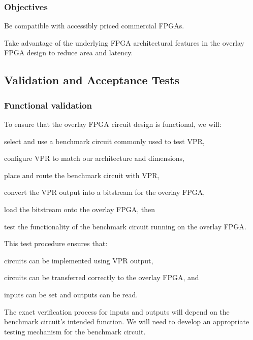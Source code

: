 \subsubsection{Objectives}

\begin{itemlist}
	\item Be compatible with accessibly priced commercial FPGAs.
	\item Take advantage of the underlying FPGA architectural features in the overlay FPGA design to reduce area and latency.
\end{itemlist}


\subsection{Validation and Acceptance Tests}


\subsubsection{Functional validation}

To ensure that the overlay FPGA circuit design is functional, we will:
\begin{enumeration}
	\item select and use a benchmark circuit commonly used to test VPR,
	\item configure VPR to match our architecture and dimensions,
	\item place and route the benchmark circuit with VPR,
	\item convert the VPR output into a bitstream for the overlay FPGA,
	\item load the bitstream onto the overlay FPGA, then 
	\item test the functionality of the benchmark circuit running on the overlay FPGA.
\end{enumeration}
This test procedure ensures that:
\begin{itemlist}
	\item circuits can be implemented using VPR output,
	\item circuits can be transferred correctly to the overlay FPGA, and
	\item inputs can be set and outputs can be read.
\end{itemlist}
The exact verification process for inputs and outputs will depend on the benchmark circuit's intended function.
We will need to develop an appropriate testing mechanism for the benchmark circuit.


